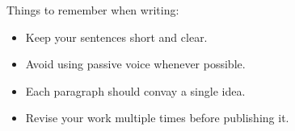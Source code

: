 \documentclass{article}
\begin{document}
Things to remember when writing:

\begin{itemize}
  \item Keep your sentences short and clear.
  \item Avoid using passive voice whenever possible.
  \item Each paragraph should convay a single idea.
  \item Revise your work multiple times before publishing it.
\end{itemize}
\end{document}
